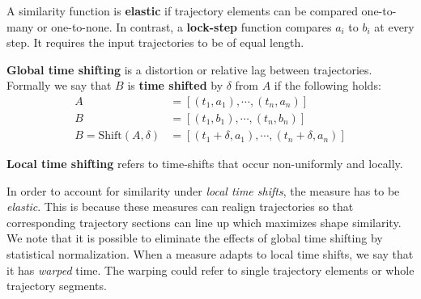 
 
\medskip
\begin{definition}\label{def:elasticity} %
A similarity function is \textbf{elastic} if trajectory elements can be compared one-to-many or one-to-none. 
In contrast, a \textbf{lock-step} function compares $a_i$ to $b_i$ at every step. It requires the input trajectories to be of equal length.
\end{definition}

\medskip
\begin{definition}\label{def:timeshift_g} %
\textbf{Global time shifting} is a distortion or relative lag between trajectories\cite{33-TimeSeries}. Formally we say that  $B$  is \textbf{time shifted} by $\delta$ from $A$ if the following  holds:
\begin{align*}
A &= [(t_1, a_1), \cdots, (t_n, a_n)] \\
B  &= [(t_1, b_1), \cdots, (t_n, b_n)] \\
B = \text{Shift}(A, \delta)  & = [(t_1+\delta, a_1), \cdots, (t_n+\delta, a_n)] 
\end{align*}

\end{definition}
\medskip 
\begin{definition} \label{def:timeshift_l}%
\textbf{Local time shifting} refers to time-shifts that occur non-uniformly and locally.
\end{definition}
\medskip


In order to account for similarity under \textit{local time shifts}, the measure has to be \textit{elastic}.
This is because these measures can realign trajectories so that corresponding trajectory sections can line up which maximizes shape similarity. 
We note that it is possible to eliminate the effects of global time shifting by statistical normalization. 
When a measure adapts to local time shifts, we say that it has \textit{warped} time. 
The warping could refer to single trajectory elements or whole trajectory segments. 



